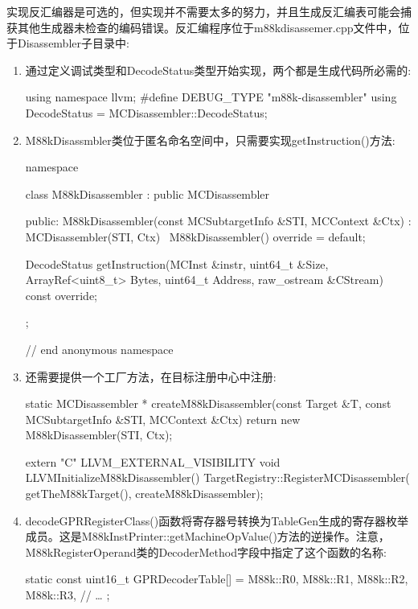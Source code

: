 实现反汇编器是可选的，但实现并不需要太多的努力，并且生成反汇编表可能会捕获其他生成器未检查的编码错误。反汇编程序位于m88kdisassemer.cpp文件中，位于Disassembler子目录中:

\begin{enumerate}
\item
通过定义调试类型和DecodeStatus类型开始实现，两个都是生成代码所必需的:

\begin{cpp}
using namespace llvm;
#define DEBUG_TYPE "m88k-disassembler"
using DecodeStatus = MCDisassembler::DecodeStatus;
\end{cpp}

\item
M88kDisassmbler类位于匿名命名空间中，只需要实现getInstruction()方法:

\begin{cpp}
namespace {
class M88kDisassembler : public MCDisassembler {
public:
    M88kDisassembler(const MCSubtargetInfo &STI,
                     MCContext &Ctx)
        : MCDisassembler(STI, Ctx) {}
    ~M88kDisassembler() override = default;

    DecodeStatus
    getInstruction(MCInst &instr, uint64_t &Size,
                    ArrayRef<uint8_t> Bytes,
                    uint64_t Address,
                    raw_ostream &CStream) const override;
};
} // end anonymous namespace
\end{cpp}

\item
还需要提供一个工厂方法，在目标注册中心中注册:

\begin{cpp}
static MCDisassembler *
createM88kDisassembler(const Target &T,
                        const MCSubtargetInfo &STI,
                        MCContext &Ctx) {
    return new M88kDisassembler(STI, Ctx);
}

extern "C" LLVM_EXTERNAL_VISIBILITY void
LLVMInitializeM88kDisassembler() {
    TargetRegistry::RegisterMCDisassembler(
        getTheM88kTarget(), createM88kDisassembler);
}
\end{cpp}

\item
decodeGPRRegisterClass()函数将寄存器号转换为TableGen生成的寄存器枚举成员。这是M88kInstPrinter::getMachineOpValue()方法的逆操作。注意，M88kRegisterOperand类的DecoderMethod字段中指定了这个函数的名称:

\begin{cpp}
static const uint16_t GPRDecoderTable[] = {
    M88k::R0, M88k::R1, M88k::R2, M88k::R3,
    // …
};


\end{cpp}
\end{enumerate}
